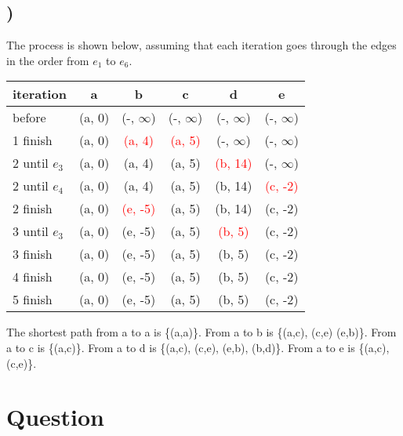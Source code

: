 \documentclass{article}
\begin{document}
\subsection{)}
The process is shown below, assuming that each iteration goes through the edges in the order from $e_1$ to $e_6$.
\begin{center}
\begin{tabular}{|l|c|c|c|c|c|}
\hline
iteration & a & b & c & d & e \\
\hline
before & (a, 0) & (-, $\infty$) & (-, $\infty$) & (-, $\infty$) & (-, $\infty$) \\
\hline
1 finish & (a, 0) & \textcolor{red}{(a, 4)} & \textcolor{red}{(a, 5)} & (-, $\infty$) & (-, $\infty$) \\
\hline
2 until $e_3$ & (a, 0) & (a, 4) & (a, 5) & \textcolor{red}{(b, 14)} & (-, $\infty$) \\
2 until $e_4$ & (a, 0) & (a, 4) & (a, 5) & (b, 14) & \textcolor{red}{(c, -2)} \\
2 finish & (a, 0) & \textcolor{red}{(e, -5)} & (a, 5) & (b, 14) & (c, -2) \\
\hline
3 until $e_3$ & (a, 0) & (e, -5) & (a, 5) & \textcolor{red}{(b, 5)} & (c, -2) \\
3 finish & (a, 0) & (e, -5) & (a, 5) & (b, 5) & (c, -2) \\
\hline
4 finish & (a, 0) & (e, -5) & (a, 5) & (b, 5) & (c, -2) \\
\hline
5 finish & (a, 0) & (e, -5) & (a, 5) & (b, 5) & (c, -2) \\
\hline
\end{tabular}
\end{center}
The shortest path from a to a is \{(a,a)\}. From a to b is \{(a,c), (c,e) (e,b)\}. From a to c is \{(a,c)\}. From a to d is \{(a,c), (c,e), (e,b), (b,d)\}. From a to e is \{(a,c), (c,e)\}.

\section{Question }
\end{document}
